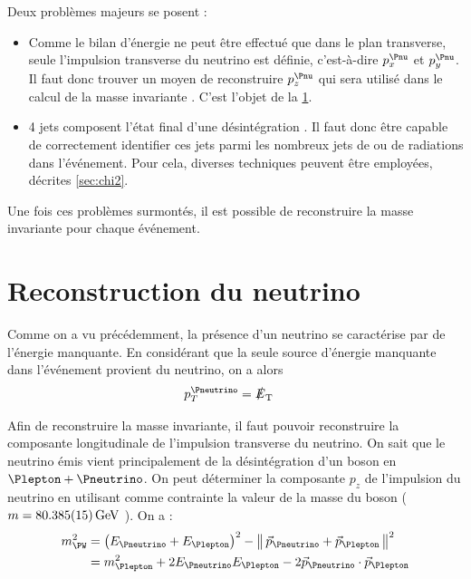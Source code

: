 Deux problèmes majeurs se posent :
\begin{itemize}
    \item Comme le bilan d'énergie ne peut être effectué que dans le plan transverse, seule l'impulsion transverse du neutrino est définie, c'est-à-dire $p_x^{\Pnu}$ et $p_y^{\Pnu}$. Il faut donc trouver un moyen de reconstruire $p_z^{\Pnu}$ qui sera utilisé dans le calcul de la masse invariante \ttbar. C'est l'objet de la \cref{sec:neutrino}.
    \item 4 jets composent l'état final d'une désintégration \ttbar. Il faut donc être capable de correctement identifier ces jets parmi les nombreux jets de \pu ou de radiations dans l'événement. Pour cela, diverses techniques peuvent être employées, décrites \cref{sec:chi2}.
\end{itemize}

Une fois ces problèmes surmontés, il est possible de reconstruire la masse invariante pour chaque événement.

\section{Reconstruction du neutrino} \label{sec:neutrino}

Comme on a vu précédemment, la présence d'un neutrino se caractérise par de l'énergie manquante. En considérant que la seule source d'énergie manquante dans l'événement provient du neutrino, on a alors
\begin{align*}
  p_T^{\Pneutrino} &= \met
\end{align*}

Afin de reconstruire la masse invariante, il faut pouvoir reconstruire la composante longitudinale de l'impulsion transverse du neutrino. On sait que le neutrino émis vient principalement de la désintégration d'un boson \PW en $\Plepton + \Pneutrino$. On peut déterminer la composante $p_z$ de l'impulsion du neutrino en utilisant comme contrainte la valeur de la masse du boson \PW ($m = \SI{80.385 \pm 0.015}{\GeV}$ \citep{pdg}). On a :
\begin{align*}
  m_{\PW}^2 &= \left( E_{\Pneutrino} + E_{\Plepton} \right)^2 - \norm{ \vec{p}_{\Pneutrino} + \vec{p}_{\Plepton} }^2 \\
  &= m_{\Plepton}^2 + 2E_{\Pneutrino}E_{\Plepton} - 2 \vec{p}_{\Pneutrino} \cdot \vec{p}_{\Plepton}
\end{align*}

